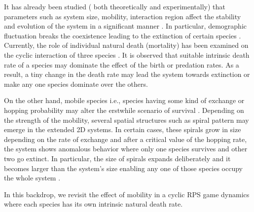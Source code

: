 \documentclass[aps, pre, twocolumn, amsmath, superscriptaddress,showkeys,showpacs]{revtex4-1}
\begin{document}
	 \par It has already been studied ({\color{red} both theoretically and experimentally}) that parameters such as system size, mobility, interaction region affect the stability and evolution of the system in a significant manner \cite{kerr2002local,pennisi2005determines,frey2010evolutionary,muller2010community}. In particular, demographic fluctuation breaks the coexistence leading to the extinction of certain species \cite{reichenbach2006coexistence,serrao2021rare,west2020fixation,berr2009zero}. Currently, {\color{red} the role of individual natural death (mortality) has been examined on the cyclic interaction of three species \cite{bhattacharyya2020mortality}.} It is observed that suitable intrinsic death rate of a species may dominate the effect of the birth or predation rates. As a result, a tiny change in the death rate may lead the system towards extinction or make any one species dominate over the others. 
	\par On the other hand, mobile species i.e., species having some kind of exchange or hopping probability may {\color{red} alter the erstwhile scenario of survival} \cite{kerr2002local,reichenbach2008self,kirkup2004antibiotic}. Depending on the strength of the mobility, several spatial structures such as spiral pattern \cite{ reichenbach2008self,avelino2012junctions, avelino2018directional} may emerge in the  extended 2D systems. In certain cases, these spirals grow in size depending on the rate of exchange and after a critical value of the hopping rate, the system shows anomalous behavior where only one species survives and other two go extinct. In particular, the size of spirals expands deliberately and it becomes larger than the system's size enabling any one of those species occupy the whole system \cite{reichenbach2007mobility}.
	\par In this backdrop, we revisit the effect of mobility in a cyclic RPS game dynamics where each species has its own intrinsic natural death rate.    
\end{document}
